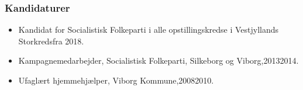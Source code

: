 \documentclass[11pt, a4paper]{awesome-cv}
\begin{document}
\begin{cvletter}
\subsubsection*{Kandidaturer}
\begin{itemize}
\item Kandidat for Socialistisk Folkeparti i alle opstillingskredse i Vestjyllands Storkredsfra 2018.
\end{itemize}
\begin{itemize}
\item Kampagnemedarbejder, Socialistisk Folkeparti, Silkeborg og Viborg,20132014.
\item Ufaglært hjemmehjælper, Viborg Kommune,20082010.
\end{itemize}
\end{cvletter}
\end{document}
